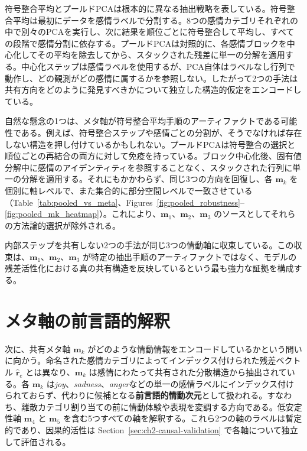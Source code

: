 符号整合平均とプールドPCAは根本的に異なる抽出戦略を表している。符号整合平均は最初にデータを感情ラベルで分割する。8つの感情カテゴリそれぞれの中で別々のPCAを実行し、次に結果を順位ごとに符号整合して平均し、すべての段階で感情分割に依存する。プールドPCAは対照的に、各感情ブロックを中心化してその平均を除去してから、スタックされた残差に単一の分解を適用する。中心化ステップは感情ラベルを使用するが、PCA自体はラベルなし行列で動作し、どの観測がどの感情に属するかを参照しない。したがって2つの手法は共有方向をどのように発見すべきかについて独立した構造的仮定をエンコードしている。\par

自然な懸念の1つは、メタ軸が符号整合平均手順のアーティファクトである可能性である。例えば、符号整合ステップや感情ごとの分割が、そうでなければ存在しない構造を押し付けているかもしれない。プールドPCAは符号整合の選択と順位ごとの再結合の両方に対して免疫を持っている。ブロック中心化後、固有値分解中に感情のアイデンティティを参照することなく、スタックされた行列に単一の分解を適用する。それにもかかわらず、同じ3つの方向を回復し、各 $\mathbf{m}_k$ を個別に軸レベルで、また集合的に部分空間レベルで一致させている（Table~\ref{tab:pooled_vs_meta}、Figures~\ref{fig:pooled_robustness}--\ref{fig:pooled_mk_heatmap}）。これにより、$\mathbf{m}_1$、$\mathbf{m}_2$、$\mathbf{m}_3$ のソースとしてそれらの方法論的選択が除外される。\par

内部ステップを共有しない2つの手法が同じ3つの情動軸に収束している。この収束は、$\mathbf{m}_1$、$\mathbf{m}_2$、$\mathbf{m}_3$ が特定の抽出手順のアーティファクトではなく、モデルの残差活性化における真の共有構造を反映しているという最も強力な証拠を構成する。\par


\section{メタ軸の前言語的解釈}
\label{sec:ch2-preverbal-interp}

次に、共有メタ軸 $\mathbf{m}_k$ がどのような情動情報をエンコードしているかという問いに向かう。命名された感情カテゴリによってインデックス付けられた残差ベクトル $\hat{\mathbf{r}}_e$ とは異なり、$\mathbf{m}_k$ は感情にわたって共有された分散構造から抽出されている。各 $\mathbf{m}_k$ は\textit{joy}、\textit{sadness}、\textit{anger}などの単一の感情ラベルにインデックス付けられておらず、代わりに候補となる\textbf{前言語的情動次元}として扱われる。すなわち、離散カテゴリ割り当ての前に情動体験や表現を変調する方向である。低安定性軸 $\mathbf{m}_4$ と $\mathbf{m}_5$ を含む5つすべての軸を解釈する。これら2つの軸のラベルは暫定的であり、因果的活性は Section~\ref{sec:ch2-causal-validation} で各軸について独立して評価される。\par


